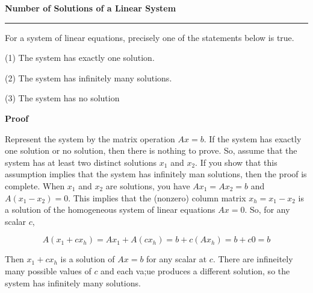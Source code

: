 \nopagenumbers
{\bf Number of Solutions of a Linear System}
\vskip 1mm
\hrule

\vskip 6pt
For a system of linear equations, precisely one of the statements below is true.

\vskip 6pt
(1) The system has exactly one solution.

\vskip 6pt
(2) The system has infinitely many solutions.

\vskip 6pt
(3) The system has no solution

\vskip 10pt
{\bf Proof}

\vskip 6pt
Represent the system by the matrix operation $Ax=b$. If the system has exactly one solution or no solution, then there is nothing to prove. So, assume that the system has at least two distinct solutions $x_1$ and $x_2$. If you show that this assumption implies that the system has infinitely man solutions, then the proof is complete. When $x_1$ and $x_2$ are solutions, you have $Ax_1=Ax_2=b$ and $A(x_1-x_2)=0$. This implies that the (nonzero) column matrix $x_h=x_1-x_2$ is a solution of the homogeneous system of linear equations $Ax=0$. So, for any scalar $c$,

$$A(x_1+cx_h)=Ax_1+A(cx_h)=b+c(Ax_h)=b+c0=b$$

Then $x_1+cx_h$ is a solution of $Ax=b$ for any scalar at $c$. There are infineitely many possible values of $c$ and each va;ue produces a different solution, so the system has infinitely many solutions.

\vfill\eject
\bye
